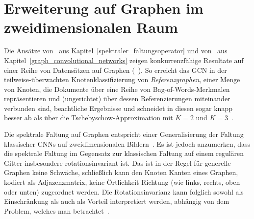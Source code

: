 \section{Erweiterung auf Graphen im zweidimensionalen Raum}
\label{gcn_erweiterung}

Die Ansätze von~\citeauthor{Defferrard} aus Kapitel~\ref{spektraler_faltungsoperator} und von~\citeauthor{gcn} aus Kapitel~\ref{graph_convolutional_networks} zeigen konkurrenzfähige Resultate auf einer Reihe von Datensätzen auf Graphen (\vgl{}~\cite{Defferrard, gcn}).
So erreicht das \gls{GCN} \zB{} in der teilweise-überwachten Knotenklassifizierung von \emph{Referenzgraphen}, \dhe{} einer Menge von Knoten, die Dokumente über eine Reihe von Bag-of-Words-Merkmalen repräsentieren und (ungerichtet) über dessen Referenzierungen miteinander verbunden sind, beachtliche Ergebnisse und schneidet in diesen sogar knapp besser ab als über die Tschebyschow-Approximation mit $K=2$ und $K=3$~\cite{gcn}.

Die spektrale Faltung auf Graphen entspricht einer Generalisierung der Faltung klassischer \glspl{CNN} auf zweidimensionalen Bildern~\cite{gcn_review}.
Es ist jedoch anzumerken, dass die spektrale Faltung im Gegensatz zur klassischen Faltung auf einem regulären Gitter insbesondere rotationsinvariant ist.
Das ist in der Regel für generelle Graphen keine Schwäche, schließlich kann den Knoten \bzw{} Kanten eines Graphen, kodiert als Adjazenzmatrix, keine Örtlichkeit \bzw{} Richtung (wie links, rechts, oben oder unten) zugeordnet werden.
Die Rotationsinvarianz kann folglich sowohl als Einschränkung als auch als Vorteil interpretiert werden, abhängig von dem Problem, welches man betrachtet~\cite{Defferrard}.



